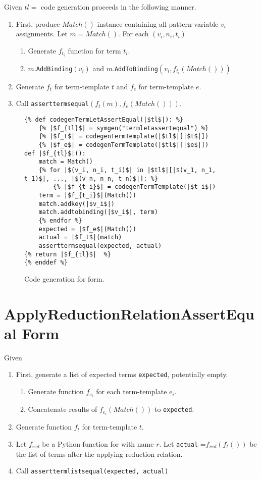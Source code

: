 Given $tl=$ \TermLetAssertEqual code generation proceeds in the following manner.
\begin{enumerate}
\item First, produce $Match()$ instance containing all pattern-variable $v_i$ assignments. Let $m=Match()$. For each $(v_i, n_i, t_i)$
	\begin{enumerate}
	\item Generate $f_{t_i}$ function for term $t_i$.
	\item $m$.\texttt{AddBinding}$(v_i)$ and $m$.\texttt{AddToBinding}$(v_i, f_{t_i}(Match()))$
	\end{enumerate}
\item Generate $f_t$ for term-template $t$ and $f_e$ for term-template $e$.
\item Call \texttt{asserttermsequal}$(f_t(m), f_e(Match()))$.
\end{enumerate}

\begin{figure}[h]
\begin{verbatim}
{% def codegenTermLetAssertEqual(|$tl$|): %}
	{% |$f_{tl}$| = symgen("termletassertequal") %}
	{% |$f_t$| = codegenTermTemplate(|$tl$|[|$t$|])
	{% |$f_e$| = codegenTermTemplate(|$tl$|[|$e$|])
def |$f_{tl}$|():
	match = Match()
	{% for |$(v_i, n_i, t_i)$| in |$tl$|[|$(v_1, n_1, t_1)$|, ..., |$(v_n, n_n, t_n)$|]: %}
		{% |$f_{t_i}$| = codegenTermTemplate(|$t_i$|)
	term = |$f_{t_i}$|(Match())
	match.addkey(|$v_i$|)
	match.addtobinding(|$v_i$|, term)
	{% endfor %}
	expected = |$f_e$|(Match())
	actual = |$f_t$|(match)
	asserttermsequal(expected, actual)
{% return |$f_{tl}$|  %}
{% enddef %}
\end{verbatim}
\caption{Code generation for \TermLetAssertEqualNoArgs \space form.}
\label{codegen-termlet}
\end{figure}


\section{ApplyReductionRelationAssertEqual Form}

Given \ApplyReductionRelationAssertEqual
\begin{enumerate}
\item First, generate a list of expected terms \texttt{expected}, potentially empty.
	\begin{enumerate}
	\item Generate function $f_{e_i}$ for each term-template $e_i$.
	\item Concatenate results of $f_{e_i}(Match())$ to \texttt{expected}.
	\end{enumerate}
\item Generate function $f_t$ for term-template $t$.
\item Let $f_{red}$ be a Python function for \RedexMatchAssertEqualNoArgs \space with name $r$. Let \texttt{actual} =$f_{red}(f_t())$ be the list of terms after the applying reduction relation.
\item Call \texttt{asserttermlistsequal(expected, actual)}
\end{enumerate}



